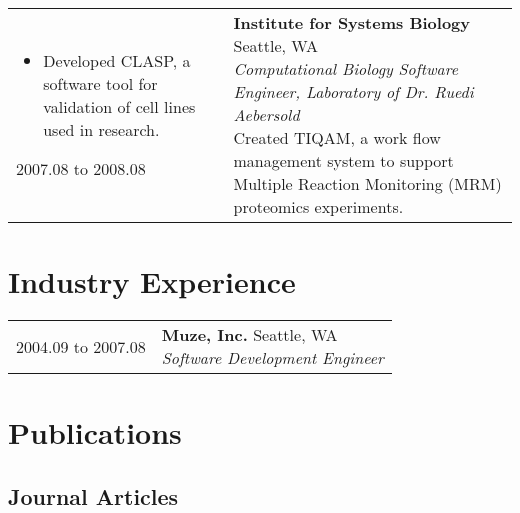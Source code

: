 \documentclass[11pt,letter,sans]{moderncv}
\makeatletter
\newenvironment{entrylistFour}{%
  \begin{tabular*}{\textwidth}{@{\extracolsep{\fill}}ll}
}{%
  \end{tabular*}
}
\newcommand{\entryFour}[4]{%
  #1&\parbox[t]{127mm}{%
    \textbf{#2}%
    \hfill%
    {\footnotesize #3}\\%
	\emph{#4}%
    \vspace{\parsep}%
  }\\}
\newenvironment{entrylistFive}{%
  \begin{tabular*}{\textwidth}{@{\extracolsep{\fill}}ll}
}{%
  \end{tabular*}
}
\newcommand{\entryFive}[5]{%
  #1&\parbox[t]{127mm}{%
    \textbf{#2}%
    \hfill%
    {\footnotesize #3}\\%
	\emph{#4}\\%
    #5\vspace{\parsep}%
  }\\}
\makeatother
\begin{document}
\begin{entrylistFive}
{\begin{itemize}
\item {Developed CLASP, a software tool for validation of cell lines used in research.}
\end{itemize}
}
\entryFive
{2007.08 to 2008.08}
{Institute for Systems Biology}
{Seattle, WA}
{Computational Biology Software Engineer, Laboratory of Dr. Ruedi Aebersold}
{Created TIQAM, a work flow management system to support Multiple Reaction Monitoring (MRM) proteomics experiments.}
\end{entrylistFive}


\section{Industry Experience}
\begin{entrylistFour}
\entryFour
{2004.09 to 2007.08}
{Muze, Inc.}
{Seattle, WA}
{Software Development Engineer}
\entryFour
{2003.09 to 2004.09}
{Encyclopaedia Britannica, Online Services}
{Chicago, IL}
{Software Developer}
\entryFour
{2001.05 to 2003.08}
{ThoughtWorks, LLC}
{Chicago, IL}
{Software Developer/Consultant}
\end{entrylistFour}

\section{Publications}
\nocite{*}

\renewcommand*{\bibfont}{\small}
\subsection{Journal Articles}
\printbibliography[heading=none,type=article,keyword=journal,resetnumbers=true]
\end{document}
